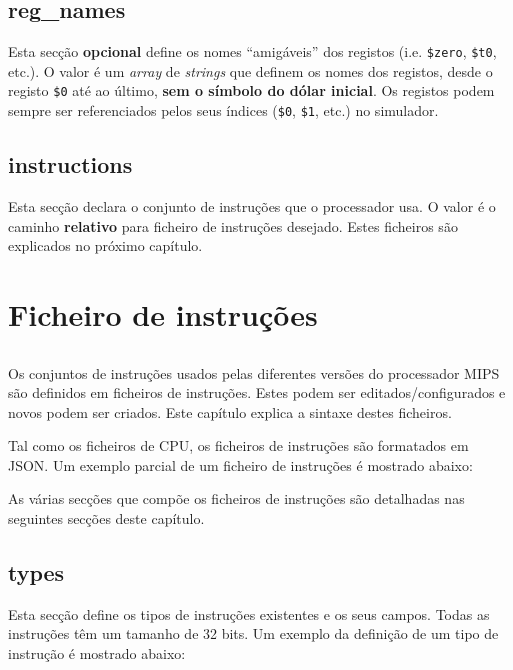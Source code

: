 \documentclass[11pt,a4paper,twoside,titlepage]{report}
\begin{document}
\section{reg\_names}

Esta secção \textbf{opcional} define os nomes ``amigáveis'' dos registos (i.e.
\verb+$zero+, \verb+$t0+, etc.).
O valor é um \emph{array} de \emph{strings} que definem os nomes dos registos,
desde o registo \verb+$0+ até ao último, \textbf{sem o símbolo do dólar inicial}.
Os registos podem sempre ser referenciados pelos seus índices (\verb+$0+,
\verb+$1+, etc.) no simulador.


\section{instructions}

Esta secção declara o conjunto de instruções que o processador usa.
O valor é o caminho \textbf{relativo} para ficheiro de instruções desejado.
Estes ficheiros são explicados no próximo capítulo.


\chapter{Ficheiro de instruções} \label{ch:set}

\section*{}

Os conjuntos de instruções usados pelas diferentes versões do processador MIPS
são definidos em ficheiros de instruções.
Estes podem ser editados/configurados e novos podem ser criados.
Este capítulo explica a sintaxe destes ficheiros.

Tal como os ficheiros de CPU, os ficheiros de instruções são formatados em JSON.
Um exemplo parcial de um ficheiro de instruções é mostrado abaixo:



As várias secções que compõe os ficheiros de instruções são detalhadas nas
seguintes secções deste capítulo.


\section{types}

Esta secção define os tipos de instruções existentes e os seus campos.
Todas as instruções têm um tamanho de 32 bits.
Um exemplo da definição de um tipo de instrução é mostrado abaixo:
\end{document}
